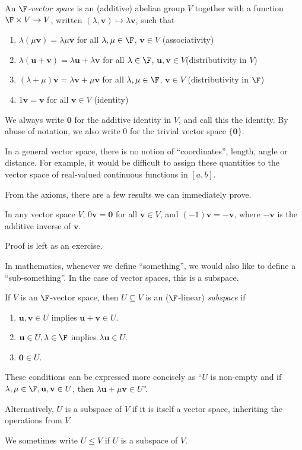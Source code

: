 \documentclass[a4paper]{article}
\begin{document}
\begin{defi}
  An \emph{$\F$-vector space} is an (additive) abelian group $V$ together with a function $\F \times V \to V$, written $(\lambda, \mathbf{v}) \mapsto \lambda \mathbf{v}$, such that
  \begin{enumerate}
    \item $\lambda(\mu \mathbf{v}) = \lambda \mu \mathbf{v}$ for all $\lambda, \mu \in \F$, $\mathbf{v}\in V$ \hfill (associativity)
    \item $\lambda(\mathbf{u} + \mathbf{v}) = \lambda \mathbf{u} + \lambda \mathbf{v}$ for all $\lambda\in \F$, $\mathbf{u}, \mathbf{v}\in V$\hfill (distributivity in $V$)
    \item $(\lambda + \mu) \mathbf{v} = \lambda \mathbf{v} + \mu \mathbf{v}$ for all $\lambda, \mu \in \F$, $\mathbf{v}\in V$ \hfill (distributivity in $\F$)
    \item $1\mathbf{v} = \mathbf{v}$ for all $\mathbf{v}\in V$ \hfill (identity)
  \end{enumerate}

  We always write $\mathbf{0}$ for the additive identity in $V$, and call this the identity. By abuse of notation, we also write $0$ for the trivial vector space $\{\mathbf{0}\}$.
\end{defi}
In a general vector space, there is no notion of ``coordinates'', length, angle or distance. For example, it would be difficult to assign these quantities to the vector space of real-valued continuous functions in $[a, b]$.

From the axioms, there are a few results we can immediately prove.
\begin{prop}
  In any vector space $V$, $0\mathbf{v} = \mathbf{0}$ for all $\mathbf{v}\in V$, and $(-1)\mathbf{v} = -\mathbf{v}$, where $-\mathbf{v}$ is the additive inverse of $\mathbf{v}$.
\end{prop}
Proof is left as an exercise.

In mathematics, whenever we define ``something'', we would also like to define a ``sub-something''. In the case of vector spaces, this is a subspace.
\begin{defi}[Subspace]
  If $V$ is an $\F$-vector space, then $U\subseteq V$ is an ($\F$-linear) \emph{subspace} if
  \begin{enumerate}
    \item $\mathbf{u}, \mathbf{v}\in U$ implies $\mathbf{u} + \mathbf{v} \in U$.
    \item $\mathbf{u}\in U, \lambda \in \F$ implies $\lambda \mathbf{u}\in U$.
    \item $\mathbf{0}\in U$.
  \end{enumerate}
  These conditions can be expressed more concisely as ``$U$ is non-empty and if $\lambda, \mu\in \F, \mathbf{u}, \mathbf{v}\in U$, then $\lambda \mathbf{u} + \mu \mathbf{v}\in U$''.

  Alternatively, $U$ is a subspace of $V$ if it is itself a vector space, inheriting the operations from $V$.

  We sometimes write $U\leq V$ if $U$ is a subspace of $V$.
\end{defi}
\end{document}
